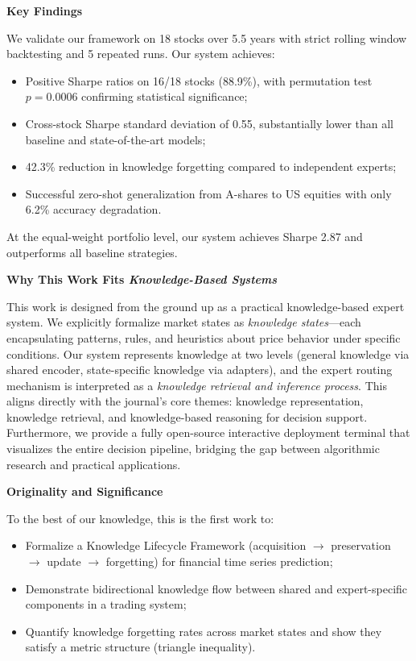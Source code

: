 \documentclass[11pt]{article}
\begin{document}
\vspace{1em}

\textbf{Key Findings}

We validate our framework on 18 stocks over 5.5 years with strict rolling window backtesting and 5 repeated runs. Our system achieves:

\begin{itemize}[leftmargin=*,nosep]
\item Positive Sharpe ratios on 16/18 stocks (88.9\%), with permutation test $p = 0.0006$ confirming statistical significance;
\item Cross-stock Sharpe standard deviation of 0.55, substantially lower than all baseline and state-of-the-art models;
\item 42.3\% reduction in knowledge forgetting compared to independent experts;
\item Successful zero-shot generalization from A-shares to US equities with only 6.2\% accuracy degradation.
\end{itemize}

At the equal-weight portfolio level, our system achieves Sharpe 2.87 and outperforms all baseline strategies.

\vspace{1em}

\textbf{Why This Work Fits \textit{Knowledge-Based Systems}}

This work is designed from the ground up as a practical knowledge-based expert system. We explicitly formalize market states as \textit{knowledge states}—each encapsulating patterns, rules, and heuristics about price behavior under specific conditions. Our system represents knowledge at two levels (general knowledge via shared encoder, state-specific knowledge via adapters), and the expert routing mechanism is interpreted as a \textit{knowledge retrieval and inference process}. This aligns directly with the journal's core themes: knowledge representation, knowledge retrieval, and knowledge-based reasoning for decision support. Furthermore, we provide a fully open-source interactive deployment terminal that visualizes the entire decision pipeline, bridging the gap between algorithmic research and practical applications.

\vspace{1em}

\textbf{Originality and Significance}

To the best of our knowledge, this is the first work to:
\begin{itemize}[leftmargin=*,nosep]
\item Formalize a Knowledge Lifecycle Framework (acquisition $\to$ preservation $\to$ update $\to$ forgetting) for financial time series prediction;
\item Demonstrate bidirectional knowledge flow between shared and expert-specific components in a trading system;
\item Quantify knowledge forgetting rates across market states and show they satisfy a metric structure (triangle inequality).
\end{itemize}
\end{document}

